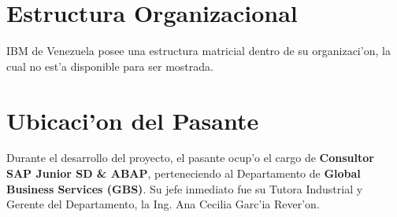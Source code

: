 \section{Estructura Organizacional} \label{sect:organizacion}
	IBM de Venezuela posee una estructura matricial dentro de su organizaci'on, la cual no est'a disponible para ser mostrada.

\section{Ubicaci'on del Pasante}
	Durante el desarrollo del proyecto, el pasante ocup'o el cargo de \textbf{Consultor SAP Junior SD \& ABAP}, perteneciendo al Departamento de  \textbf{Global Business Services (GBS)}. Su jefe inmediato fue su Tutora Industrial y Gerente del Departamento, la Ing. Ana Cecilia Garc'ia Rever'on. 